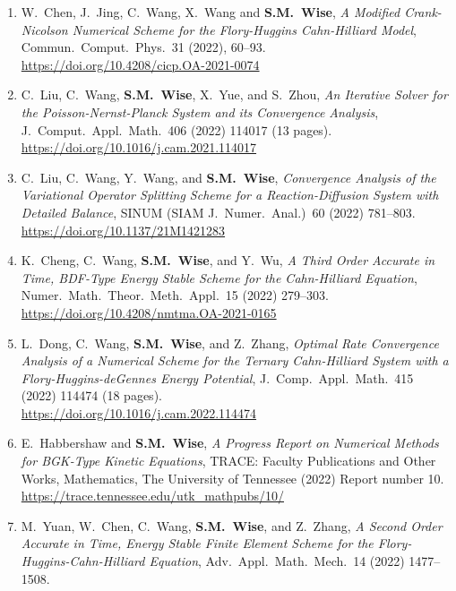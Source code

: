 \documentclass[11pt]{letter}
\begin{document}
\begin{enumerate}
	\item
W.~Chen, J.~Jing, C.~Wang, X.~Wang and \textbf{S.M.~Wise}, {\sl A Modified Crank-Nicolson Numerical Scheme for the Flory-Huggins Cahn-Hilliard Model}, Commun.~Comput.~Phys.~31 (2022), 60--93.
	\\ 
\url{https://doi.org/10.4208/cicp.OA-2021-0074}

	\item
C.~Liu, C.~Wang, \textbf{S.M.~Wise}, X.~Yue, and S.~Zhou, {\sl An Iterative Solver for the Poisson-Nernst-Planck System and its Convergence Analysis},  J.~Comput.~Appl.~Math.~406 (2022) 114017 (13 pages).
	\\ 
\url{https://doi.org/10.1016/j.cam.2021.114017}

	\item
C.~Liu, C.~Wang, Y.~Wang, and \textbf{S.M.~Wise}, {\sl Convergence Analysis of the Variational Operator Splitting Scheme for a Reaction-Diffusion System with Detailed Balance}, SINUM (SIAM J.~Numer.~Anal.)~60 (2022) 781--803.
	\\
\url{https://doi.org/10.1137/21M1421283}

	\item
K.~Cheng, C.~Wang, \textbf{S.M.~Wise}, and Y.~Wu, {\sl A Third Order Accurate in Time, BDF-Type Energy Stable Scheme for the Cahn-Hilliard Equation}, Numer.~Math.~Theor.~Meth.~Appl.~15 (2022) 279--303.
	\\
\url{https://doi.org/10.4208/nmtma.OA-2021-0165}

	\item
L.~Dong, C.~Wang, \textbf{S.M.~Wise}, and Z.~Zhang, {\sl Optimal Rate Convergence Analysis of a Numerical Scheme for the Ternary Cahn-Hilliard System with a Flory-Huggins-deGennes Energy Potential}, J.~Comp.~Appl.~Math.~415 (2022) 114474 (18 pages).
	\\
\url{https://doi.org/10.1016/j.cam.2022.114474}

	\item
E.~Habbershaw and \textbf{S.M.~Wise}, {\sl A Progress Report on Numerical Methods for BGK-Type Kinetic Equations}, TRACE: Faculty Publications and Other Works, Mathematics, The University of Tennessee (2022) Report number 10.
 	\\
\url{https://trace.tennessee.edu/utk_mathpubs/10/}

	\item
M.~Yuan, W.~Chen, C.~Wang, \textbf{S.M.~Wise}, and Z.~Zhang, {\sl A Second Order Accurate in Time, Energy Stable Finite Element Scheme for the Flory-Huggins-Cahn-Hilliard Equation}, Adv.~Appl.~Math.~Mech.~14 (2022) 1477--1508.


\end{enumerate}
\end{document}
